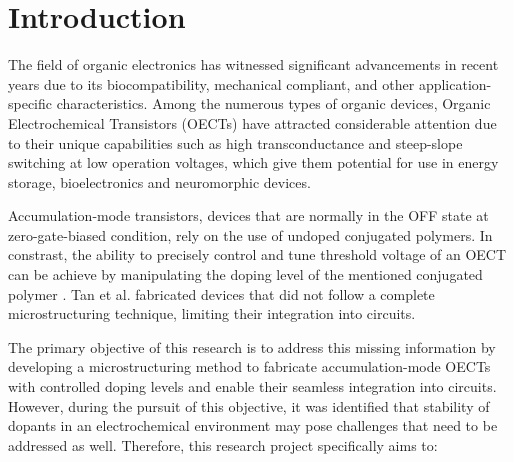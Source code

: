 \chapter{Introduction}
\label{cha:intro}

The field of organic electronics has witnessed significant advancements in recent years due to its biocompatibility, mechanical compliant, and other application-specific characteristics. Among the numerous types of organic devices, Organic Electrochemical Transistors (OECTs) have attracted considerable attention due to their unique capabilities such as high transconductance and steep-slope switching at low operation voltages, which give them potential for use in energy storage, bioelectronics and neuromorphic devices. 

Accumulation-mode transistors, devices that are normally in the OFF state at zero-gate-biased condition, rely on the use of undoped conjugated polymers. In constrast, the ability to precisely control and tune threshold voltage of an OECT can be achieve by manipulating the doping level of the mentioned conjugated polymer \cite{tanTuningOrganicElectrochemical2022}. Tan et al. fabricated devices that did not follow a complete microstructuring technique, limiting their integration into circuits. 



The primary objective of this research is to address this missing information by developing a microstructuring method to fabricate accumulation-mode OECTs with controlled doping levels and enable their seamless integration into circuits. However, during the pursuit of this objective, it was identified that stability of dopants in an electrochemical environment may pose challenges that need to be addressed as well. Therefore, this research project specifically aims to:

